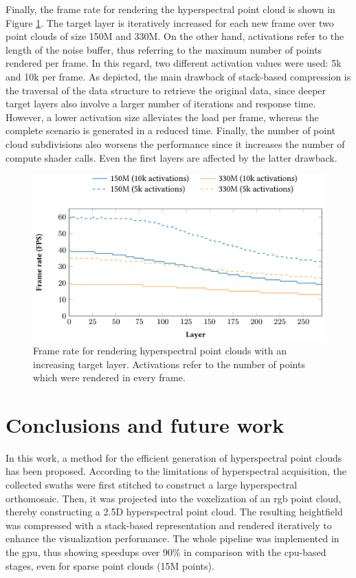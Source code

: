Finally, the frame rate for rendering the hyperspectral point cloud is shown in Figure \ref{fig:hyper_fps_performance}. The target layer is iteratively increased for each new frame over two point clouds of size 150M and 330M. On the other hand, activations refer to the length of the noise buffer, thus referring to the maximum number of points rendered per frame. In this regard, two different activation values were used: 5k and 10k per frame. As depicted, the main drawback of stack-based compression is the traversal of the data structure to retrieve the original data, since deeper target layers also involve a larger number of iterations and response time. However, a lower activation size alleviates the load per frame, whereas the complete scenario is generated in a reduced time. Finally, the number of point cloud subdivisions also worsens the performance since it increases the number of compute shader calls. Even the first layers are affected by the latter drawback. 

\begin{figure}[bt]
    \centering
    \includegraphics[width=\linewidth]{figs/hyper_point_cloud/hyper_fps_results.png}
	\caption{Frame rate for rendering hyperspectral point clouds with an increasing target layer. Activations refer to the number of points which were rendered in every frame. }
	\label{fig:hyper_fps_performance}
\end{figure}

\section{Conclusions and future work}

In this work, a method for the efficient generation of hyperspectral point clouds has been proposed. According to the limitations of hyperspectral acquisition, the collected swaths were first stitched to construct a large hyperspectral orthomosaic. Then, it was projected into the voxelization of an \acrshort{rgb} point cloud, thereby constructing a 2.5D hyperspectral point cloud. The resulting heightfield was compressed with a stack-based representation and rendered iteratively to enhance the visualization performance. The whole pipeline was implemented in the \acrshort{gpu}, thus showing speedups over 90\% in comparison with the \acrshort{cpu}-based stages, even for sparse point clouds (15M points).

